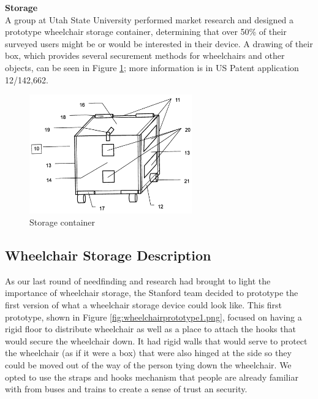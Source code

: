 \noindent\textbf{Storage}\\
A group at Utah State University performed market research \cite{USU_survey} and designed a prototype wheelchair storage container, determining that over 50\% of their surveyed users might be or would be interested in their device. A drawing of their box, which provides several securement methods for wheelchairs and other objects, can be seen in Figure \ref{fig:USU_box}; more information is in US Patent application 12/142,662.\cite{USU_patent}

\begin{figure}[h]
  \centering
     \includegraphics[width=7cm]{images/USU_box.png}
   \caption{Storage container}
  \label{fig:USU_box}
\end{figure}

\subsection{Wheelchair Storage Description}

As our last round of needfinding and research had brought to light the importance of wheelchair storage, the Stanford team decided to prototype the first version of what a wheelchair storage device could look like. This first prototype, shown in 
Figure \ref{fig:wheelchairprototype1.png}, focused on having a rigid floor to distribute wheelchair as well as a place to attach the hooks that would secure the wheelchair down. It had rigid walls that would serve to protect the wheelchair (as if it were a box) that were also hinged at the side so they could be moved out of the way of the person tying down the wheelchair. We opted to use the straps and hooks mechanism that people are already familiar with from buses and trains to create a sense of trust an security. 

